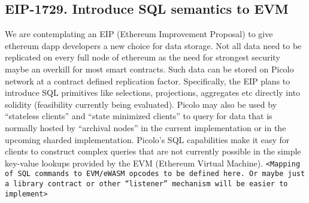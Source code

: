 \newpage

\begin{appendices}

\section{EIP-1729. Introduce SQL semantics to EVM }
We are contemplating an EIP (Ethereum Improvement Proposal) to give ethereum dapp developers a new choice for data storage. Not all data need to be replicated on every full node of ethereum as the need for strongest security maybe an overkill for most smart contracts. Such data can be stored on Picolo network at a contract defined replication factor. Specifically, the EIP plans to introduce SQL primitives like selections, projections, aggregates etc directly into solidity (feasibility currently being evaluated).
\newline
\newline
Picolo may also be used by ``stateless clients'' and ``state minimized clients'' to query for data that is normally hosted by ``archival nodes'' in the current implementation or in the upcoming sharded implementation. Picolo's SQL capabilities make it easy for clients to construct complex queries that are not currently possible in the simple key-value lookups provided by the EVM (Ethereum Virtual Machine).
\newline\newline
\texttt{<Mapping of SQL commands to EVM/eWASM opcodes to be defined here. Or maybe just a library contract or other ``listener'' mechanism will be easier to implement>}
\end{appendices}
